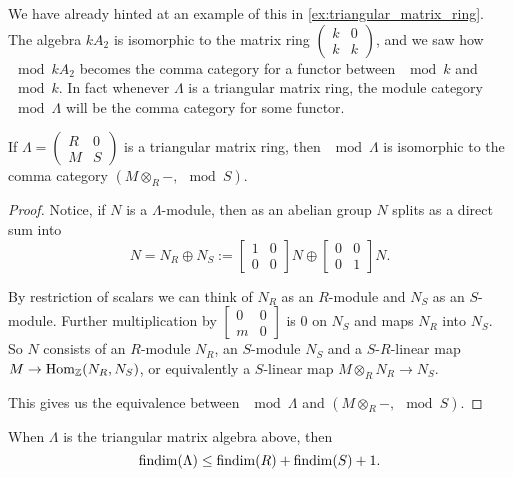 We have already hinted at an example of this in \cref{ex:triangular_matrix_ring}. The algebra $kA_2$ is isomorphic to the matrix ring $\begin{pmatrix}
k & 0\\
k & k
\end{pmatrix}$, and we saw how $\mod kA_2$ becomes the comma category for a functor between $\mod k$ and $\mod k$. In fact whenever $\Lambda$ is a triangular matrix ring, the module category $\mod \Lambda$ will be the comma category for some functor.

\begin{prop}\label{prop:triangular_matrix_is_comma_cat}
	If $\Lambda = \begin{pmatrix}
	R & 0\\
	M & S
	\end{pmatrix}$ is a triangular matrix ring, then $\mod \Lambda$ is isomorphic to the comma category $(M \otimes_R -, \mod S)$.
	\begin{proof}
		Notice, if $N$ is a $\Lambda$-module, then as an abelian group $N$ splits as a direct sum into
		$$N= N_R \oplus N_S :=
		\begin{bmatrix}
		1 & 0\\
		0 & 0
		\end{bmatrix}N \oplus
		\begin{bmatrix}
		0 & 0\\
		0 & 1
		\end{bmatrix}N.$$
		
		By restriction of scalars we can think of $N_R$ as an $R$-module and $N_S$ as an $S$-module. Further multiplication by $\begin{bmatrix}
		0 & 0\\
		m & 0
		\end{bmatrix}$ is 0 on $N_S$ and maps $N_R$ into $N_S$. So $N$ consists of an $R$-module $N_R$, an $S$-module $N_S$ and a $S$-$R$-linear map $M \to \operatorname{Hom}_\mathbb{Z}(N_R, N_S)$, or equivalently a $S$-linear map $M \otimes_R N_R \to N_S$.
		
		This gives us the equivalence between $\mod \Lambda$ and $(M \otimes_R -, \mod S)$.
	\end{proof}
\end{prop} 

\begin{cor}
	When $\Lambda$ is the triangular matrix algebra above, then 
	$$\operatorname{findim}(\Lambda) \leq \operatorname{findim}(R) + \operatorname{findim}(S)+1.$$
\end{cor}


